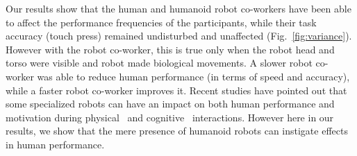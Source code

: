 Our results show that the human and humanoid robot co-workers have been able to affect the performance frequencies of the participants, while their task accuracy (touch press) remained undisturbed and unaffected (Fig.~\ref{fig:variance}). However with the robot co-worker, this is true only when the robot head and torso were visible and robot made biological movements. A slower robot co-worker was able to reduce human performance (in terms of speed and accuracy), while a faster robot co-worker improves it. Recent studies have pointed out that some specialized robots can have an impact on both human performance and motivation during physical~\cite{Takagi:Nature:2017} and cognitive~\cite{Fasola:ICDL:2010} interactions. However here in our results, we show that the mere presence of humanoid robots can instigate effects in human performance. 


